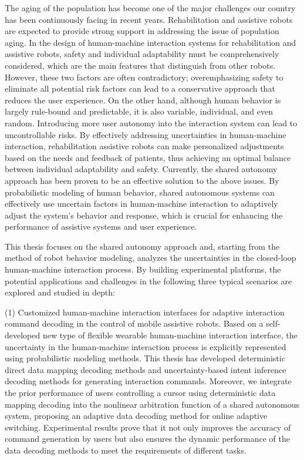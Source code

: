 \begin{abstract*}
The aging of the population has become one of the major challenges our country has been continuously facing in recent years. Rehabilitation and assistive robots are expected to provide strong support in addressing the issue of population aging. In the design of human-machine interaction systems for rehabilitation and assistive robots, safety and individual adaptability must be comprehensively considered, which are the main features that distinguish from other robots. However, these two factors are often contradictory; overemphasizing safety to eliminate all potential risk factors can lead to a conservative approach that reduces the user experience. On the other hand, although human behavior is largely rule-bound and predictable, it is also variable, individual, and even random. Introducing more user autonomy into the interaction system can lead to uncontrollable risks. By effectively addressing uncertainties in human-machine interaction, rehabilitation assistive robots can make personalized adjustments based on the needs and feedback of patients, thus achieving an optimal balance between individual adaptability and safety. Currently, the shared autonomy approach has been proven to be an effective solution to the above issues. By probabilistic modeling of human behavior, shared autonomous systems can effectively use uncertain factors in human-machine interaction to adaptively adjust the system's behavior and response, which is crucial for enhancing the performance of assistive systems and user experience. 

This thesis focuses on the shared autonomy approach and, starting from the method of robot behavior modeling, analyzes the uncertainties in the closed-loop human-machine interaction process. By building experimental platforms, the potential applications and challenges in the following three typical scenarios are explored and studied in depth: 

(1) Customized human-machine interaction interfaces for adaptive interaction command decoding in the control of mobile assistive robots. Based on a self-developed new type of flexible wearable human-machine interaction interface, the uncertainty in the human-machine interaction process is explicitly represented using probabilistic modeling methods. This thesis has developed deterministic direct data mapping decoding methods and uncertainty-based intent inference decoding methods for generating interaction commands. Moreover, we integrate the prior performance of users controlling a cursor using deterministic data mapping decoding into the nonlinear arbitration function of a shared autonomous system, proposing an adaptive data decoding method for online adaptive switching. Experimental results prove that it not only improves the accuracy of command generation by users but also ensures the dynamic performance of the data decoding methods to meet the requirements of different tasks.


\end{abstract*}
